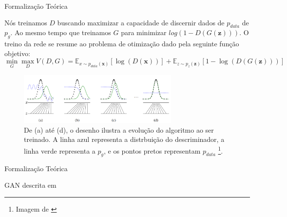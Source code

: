 \documentclass[10pt]{beamer}
\begin{document}
\begin{frame}[fragile]{Formalização Teórica}
	
	Nós treinamos $D$ buscando maximizar
	a capacidade de discernir dados de $p_{data}$ de $p_g$. Ao
	mesmo tempo que treinamos $G$ para minimizar $log(1-D(G(\bm z)))$.
	O treino da rede se resume ao problema de otimização dado
	pela seguinte função objetivo:
	\small
    $$
    \min_{G} \max_D V(D,G) =
    \mathbb{E}_{x\sim p_{data}(\bm x)}\left[\log{(D(\bm x))}\right]+
    \mathbb{E}_{z\sim p_z(\bm z)}\left[1-\log{(D(G(\bm z)))}\right]
    $$

    \begin{figure}[H]
        \centering
        \includegraphics[width=8cm]{images/gan-algorithmscheme.png}
        \caption{De (a) até (d), o desenho ilustra a evolução do
        algoritmo ao ser treinado. A linha azul representa a
        distrbuição do descriminador, a linha verde representa
        a $p_g$, e os pontos pretos representam $p_{data}$
        \footnote{Imagem de \citet{goodfellow2014}}.}
    \end{figure}
	 
\end{frame}

\begin{frame}[fragile]{Formalização Teórica}

  \footnotesize
  \begin{algorithm}[H]
  \SetAlgoLined
   \caption{GAN descrita em \citet{goodfellow2014}}
  \end{algorithm}

\end{frame}
\end{document}
